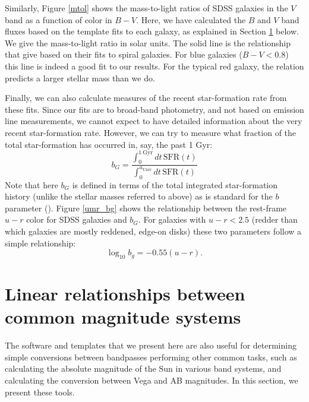 \documentclass[10pt,preprint]{aastex}
\begin{document}
Similarly, Figure \ref{mtol} shows the mass-to-light ratios of SDSS
galaxies in the $V$ band as a function of color in $B-V$. Here, we
have calculated the $B$ and $V$ band fluxes based on the template fits
to each galaxy, as explained in Section \ref{sdss2bessell} below. We
give the mass-to-light ratio in solar units. The solid line is the
relationship that \citet{bell01b} give based on their fits to spiral
galaxies. For blue galaxies ($B-V < 0.8$) this line is indeed a good
fit to our results. For the typical red galaxy, the \citet{bell01b}
relation predicts a larger stellar mass than we do. 

Finally, we can also calculate measures of the recent star-formation
rate from these fits. Since our fits are to broad-band photometry, and
not based on emission line measurements, we cannot expect to have
detailed information about the very recent star-formation
rate. However, we can try to measure what fraction of the total
star-formation has occurred in, say, the past 1 Gyr:
\begin{equation}
b_{G} = \frac{\int_0^{1\mathrm{~Gyr}} dt\, \mathrm{SFR}(t)}
{\int_0^{a_{\mathrm{Univ}}} dt\, \mathrm{SFR}(t)}
\end{equation}
Note that here $b_G$ is defined in terms of the total integrated
star-formation history (unlike the stellar masses referred to above)
as is standard for the $b$ parameter (\citealt{kennicutt98a}). Figure
\ref{umr_bg} shows the relationship between the rest-frame $u-r$ color
for SDSS galaxies and $b_G$. For galaxies with $u-r < 2.5$ (redder
than which galaxies are mostly reddened, edge-on disks) these two 
parameters follow a simple relationship:
\begin{equation}
\log_{10} b_g = -0.55 (u-r). 
\end{equation}

\section{Linear relationships between common magnitude systems}
\label{sdss2bessell}

The software and templates that we present here are also useful for
determining simple conversions between bandpasses performing other
common tasks, such as calculating the absolute magnitude of the Sun in
various band systems, and calculating the conversion between Vega and
AB magnitudes. In this section, we present these tools.
\end{document}
